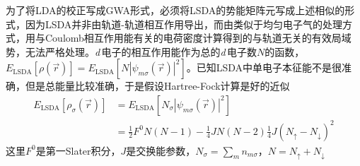 为了将LDA的校正写成GWA形式，必须将LSDA的势能矩阵元写成上述相似的形式，因为LSDA并非由轨道-轨道相互作用导出，而由类似于均匀电子气的处理方式，用与Coulomb相互作用能有关的电荷密度计算得到的与轨道无关的有效局域势，无法严格处理。{\textit d}\,电子的相互作用能作为总的{\textit d}\,电子数$N$的函数，$E_{\mathrm{LSDA}}[\rho(\vec r)]=E_{\mathrm{LSDA}}[N|\psi_{m\sigma}(\vec r)|^2]$。已知LSDA中单电子本征能不是很准确，但是总能量比较准确，于是假设Hartree-Fock计算是好的近似
\begin{equation}
  \begin{split}
	  E_{\mathrm{LSDA}}[\rho_{\sigma}(\vec r)]&=E_{\mathrm{LSDA}}[N_{\sigma}|\psi_{m\sigma}(\vec r)|^2]\\
   &=\frac12F^0N(N-1)-\frac14JN(N-2)\frac14J(N_{\uparrow}-N_{\downarrow})^2
 \end{split}
  \label{eq:solid-248}
\end{equation}
这里$F^0$是第一Slater积分，$J$是交换能参数，$N_{\sigma}=\sum\nolimits_mn_{m\sigma}$，$N=N_{\uparrow}+N_{\downarrow}$

